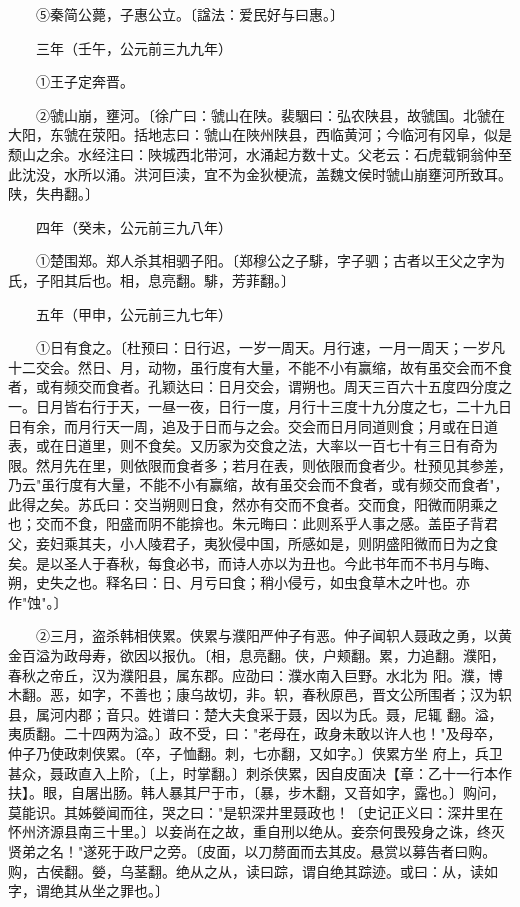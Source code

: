 　　⑤秦简公薨，子惠公立。〔諡法：爱民好与曰惠。〕

　　三年（壬午，公元前三九九年）

　　①王子定奔晋。

　　②虢山崩，壅河。〔徐广曰：虢山在陕。裴駰曰：弘农陕县，故虢国。北虢在大阳，东虢在荥阳。括地志曰：虢山在陜州陕县，西临黄河；今临河有冈阜，似是颓山之余。水经注曰：陜城西北带河，水涌起方数十丈。父老云：石虎载铜翁仲至此沈没，水所以涌。洪河巨渎，宜不为金狄梗流，盖魏文侯时虢山崩壅河所致耳。陕，失冉翻。〕

　　四年（癸未，公元前三九八年）

　　①楚围郑。郑人杀其相驷子阳。〔郑穆公之子騑，字子驷；古者以王父之字为氏，子阳其后也。相，息亮翻。騑，芳菲翻。〕

　　五年（甲申，公元前三九七年）

　　①日有食之。〔杜预曰：日行迟，一岁一周天。月行速，一月一周天；一岁凡十二交会。然日、月，动物，虽行度有大量，不能不小有赢缩，故有虽交会而不食者，或有频交而食者。孔颖达曰：日月交会，谓朔也。周天三百六十五度四分度之一。日月皆右行于天，一昼一夜，日行一度，月行十三度十九分度之七，二十九日日有余，而月行天一周，追及于日而与之会。交会而日月同道则食；月或在日道表，或在日道里，则不食矣。又历家为交食之法，大率以一百七十有三日有奇为限。然月先在里，则依限而食者多；若月在表，则依限而食者少。杜预见其参差，乃云"虽行度有大量，不能不小有赢缩，故有虽交会而不食者，或有频交而食者"，此得之矣。苏氏曰：交当朔则日食，然亦有交而不食者。交而食，阳微而阴乘之也；交而不食，阳盛而阴不能揜也。朱元晦曰：此则系乎人事之感。盖臣子背君父，妾妇乘其夫，小人陵君子，夷狄侵中国，所感如是，则阴盛阳微而日为之食矣。是以圣人于春秋，每食必书，而诗人亦以为丑也。今此书年而不书月与晦、朔，史失之也。释名曰：日、月亏曰食；稍小侵亏，如虫食草木之叶也。亦作"蚀"。〕

　　②三月，盗杀韩相侠累。侠累与濮阳严仲子有恶。仲子闻轵人聂政之勇，以黄金百溢为政母寿，欲因以报仇。〔相，息亮翻。侠，户颊翻。累，力追翻。濮阳，春秋之帝丘，汉为濮阳县，属东郡。应劭曰：濮水南入巨野。水北为 阳。濮，博木翻。恶，如字，不善也；康乌故切，非。轵，春秋原邑，晋文公所围者；汉为轵县，属河内郡；音只。姓谱曰：楚大夫食采于聂，因以为氏。聂，尼辄 翻。溢，夷质翻。二十四两为溢。〕政不受，曰："老母在，政身未敢以许人也！"及母卒，仲子乃使政刺侠累。〔卒，子恤翻。刺，七亦翻，又如字。〕侠累方坐 府上，兵卫甚众，聂政直入上阶，〔上，时掌翻。〕刺杀侠累，因自皮面决【章：乙十一行本作扶】。眼，自屠出肠。韩人暴其尸于市，〔暴，步木翻，又音如字，露也。〕购问，莫能识。其姊嫈闻而往，哭之曰："是轵深井里聂政也！〔史记正义曰：深井里在怀州济源县南三十里。〕以妾尚在之故，重自刑以绝从。妾奈何畏殁身之诛，终灭贤弟之名！"遂死于政尸之旁。〔皮面，以刀剺面而去其皮。悬赏以募告者曰购。购，古侯翻。嫈，乌茎翻。绝从之从，读曰踪，谓自绝其踪迹。或曰：从，读如字，谓绝其从坐之罪也。〕

